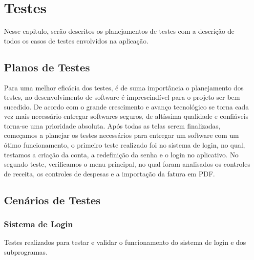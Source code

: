% 

\chapter[Testes]{Testes}

Nesse capitulo, serão descritos os planejamentos de testes com a descrição de todos os casos de testes envolvidos na aplicação.

\section{Planos de Testes}

Para uma melhor eficácia dos testes, é de suma importância o planejamento dos testes, no desenvolvimento de software é imprescindível para o projeto ser bem sucedido. De acordo com o grande crescimento e avanço tecnológico se torna cada vez mais necessário entregar softwares seguros, de altíssima qualidade e confiáveis torna-se uma prioridade absoluta. 
Após todas as telas serem finalizadas, começamos a planejar os testes necessários para entregar um software com um ótimo funcionamento, o primeiro teste realizado foi no sistema de login, no qual, testamos a criação da conta, a redefinição da senha e o login no aplicativo. No segundo teste, verificamos o menu principal, no qual foram analisados os controles de receita, os controles de despesas e a importação da fatura em PDF. 


\section{Cenários de Testes}

\subsection{Sistema de Login}

Testes realizados para testar e validar o funcionamento do sistema de login e dos subprogramas.

\vspace{\baselineskip}
\vspace{\baselineskip}
\vspace{\baselineskip}
\vspace{\baselineskip}
\vspace{\baselineskip}
\vspace{\baselineskip}
\vspace{\baselineskip}
\vspace{\baselineskip}
\vspace{\baselineskip}
\vspace{\baselineskip}
\vspace{\baselineskip}

